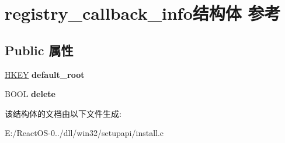 \hypertarget{structregistry__callback__info}{}\section{registry\+\_\+callback\+\_\+info结构体 参考}
\label{structregistry__callback__info}
\subsection*{Public 属性}
\begin{DoxyCompactItemize}
\item 
\mbox{\label{structregistry__callback__info_a2fc93846e0ef0df6b99750ede7b0aa66}} 
\hyperlink{interfacevoid}{H\+K\+EY} {\bfseries default\+\_\+root}
\item 
\mbox{\label{structregistry__callback__info_a83e077a6e0e5d6293bb889d7816abf20}} 
B\+O\+OL {\bfseries delete}
\end{DoxyCompactItemize}


该结构体的文档由以下文件生成\+:\begin{DoxyCompactItemize}
\item 
E\+:/\+React\+O\+S-\/0../dll/win32/setupapi/install.\+c\end{DoxyCompactItemize}
